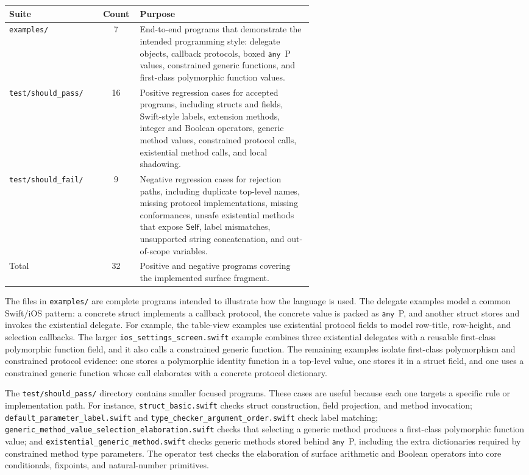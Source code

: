 \documentclass[manuscript,nonacm]{acmart}
\newcommand{\kw}[1]{\ensuremath{\mathsf{#1}}}
\newcommand{\Self}{\kw{Self}\xspace}
\newcommand{\Any}[1]{\kw{any}\ #1}
\begin{document}
\begin{center}
\begin{tabular}{|l|c|p{0.58\linewidth}|}
\hline
Suite & Count & Purpose \\
\hline
\texttt{examples/} & 7 &
End-to-end programs that demonstrate the intended programming style:
delegate objects, callback protocols, boxed \Any{P} values, constrained generic functions, and first-class polymorphic function values. \\
\hline
\texttt{test/should\_pass/} & 16 &
Positive regression cases for accepted programs, including structs and fields, Swift-style labels, extension methods, integer and Boolean operators, generic method values, constrained protocol calls, existential method calls, and local shadowing. \\
\hline
\texttt{test/should\_fail/} & 9 &
Negative regression cases for rejection paths, including duplicate top-level names, missing protocol implementations, missing conformances, unsafe existential methods that expose \Self, label mismatches, unsupported string concatenation, and out-of-scope variables. \\
\hline
Total & 32 & Positive and negative programs covering the implemented surface fragment. \\
\hline
\end{tabular}
\end{center}

The files in \texttt{examples/} are complete programs intended to illustrate how the language is used.
The delegate examples model a common Swift/iOS pattern:
a concrete struct implements a callback protocol, the concrete value is packed as \Any{P}, and another struct stores and invokes the existential delegate.
For example, the table-view examples use existential protocol fields to model row-title, row-height, and selection callbacks.
The larger \texttt{ios\_settings\_screen.swift} example combines three existential delegates with a reusable first-class polymorphic function field, and it also calls a constrained generic function.
The remaining examples isolate first-class polymorphism and constrained protocol evidence:
one stores a polymorphic identity function in a top-level value, one stores it in a struct field, and one uses a constrained generic function whose call elaborates with a concrete protocol dictionary.

The \texttt{test/should\_pass/} directory contains smaller focused programs.
These cases are useful because each one targets a specific rule or implementation path.
For instance, \texttt{struct\_basic.swift} checks struct construction, field projection, and method invocation;
\texttt{default\_parameter\_label.swift} and \texttt{type\_checker\_argument\_order.swift} check label matching;
\texttt{generic\_method\_value\_selection\_elaboration.swift} checks that selecting a generic method produces a first-class polymorphic function value;
and \texttt{existential\_generic\_method.swift} checks generic methods stored behind \Any{P}, including the extra dictionaries required by constrained method type parameters.
The operator test checks the elaboration of surface arithmetic and Boolean operators into core conditionals, fixpoints, and natural-number primitives.
\end{document}
